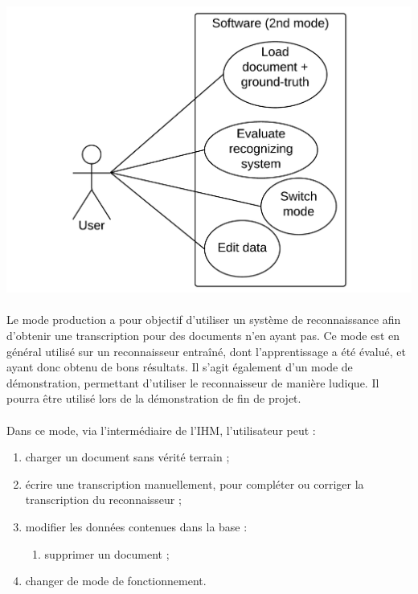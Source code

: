 \newpage

\begin{mdframed}[frametitle={Figure 3 : Diagramme de cas d'utilisation (mode évaluation)}, innerbottommargin=10]
\begin{center}
\includegraphics[scale=0.4]{Usecase_2.pdf}
\end{center}
\end{mdframed}

\paragraph{}
Le mode production a pour objectif d’utiliser un système de reconnaissance afin
d’obtenir une transcription pour des documents n’en ayant pas. Ce mode est en
général utilisé sur un reconnaisseur entraîné, dont l’apprentissage a été
évalué, et ayant donc obtenu de bons résultats. Il s’agit également d’un mode
de démonstration, permettant d’utiliser le reconnaisseur de manière ludique.
Il pourra être utilisé lors de la démonstration de fin de projet.

\paragraph{}
Dans ce mode, via l'intermédiaire de l’IHM, l’utilisateur peut :
\begin{enumerate}
\item charger un document sans vérité terrain ;
\item écrire une transcription manuellement, pour compléter ou corriger la
transcription du reconnaisseur ;
\item modifier les données contenues dans la base :
\begin{enumerate}
\item supprimer un document ;
\end{enumerate}
\item changer de mode de fonctionnement.
\end{enumerate}

